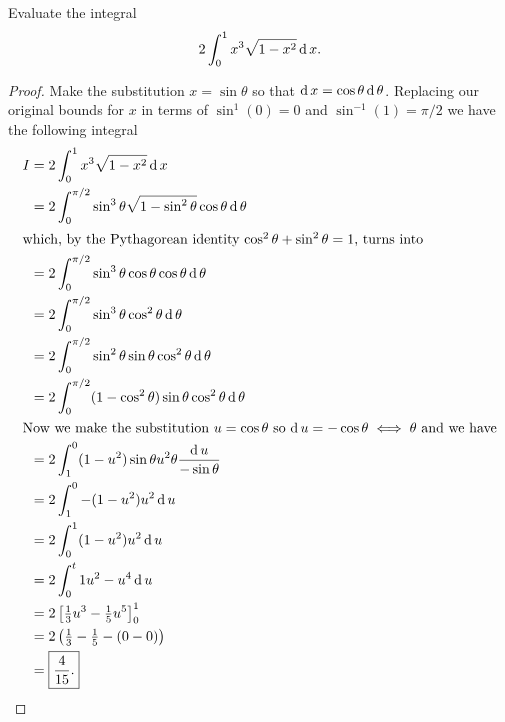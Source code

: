 \begin{problem}[WebAssign, HW 11, \#2]
Evaluate the integral
\[
2\int_0^1 x^3\sqrt{1-x^2}\operatorname{d} x.
\]
\end{problem}
\begin{proof}
Make the substitution $x=\sin\theta$ so that $\operatorname{d}
x=\cos\theta\operatorname{d}\theta$. Replacing our original bounds for $x$ in terms of
$\sin^1(0)=0$ and $\sin^{-1}(1)=\pi/2$ we have the following integral
\begin{align*}
I&=2\int_0^1 x^3\sqrt{1-x^2}\operatorname{d} x\\
 &=2\int_0^{\pi/2}\sin^3\theta\sqrt{1-\sin^2\theta}\cos\theta\operatorname{d}\theta\\
\intertext{which, by the Pythagorean identity
  $\cos^2\theta+\sin^2\theta=1$, turns into}
 &=2\int_0^{\pi/2}\sin^3\theta\cos\theta\cos\theta\operatorname{d}\theta\\
 &=2\int_0^{\pi/2}\sin^3\theta\cos^2\theta\operatorname{d}\theta\\
 &=2\int_0^{\pi/2}\sin^2\theta\sin\theta\cos^2\theta\operatorname{d}\theta\\
 &=2\int_0^{\pi/2}(1-\cos^2\theta)\sin\theta\cos^2\theta\operatorname{d}\theta\\
\intertext{Now we make the substitution $u=\cos\theta$ so $\operatorname{d}
  u=-\cos\theta\iff\theta$ and we have}
 &=2\int_1^0(1-u^2)\sin\theta u^2\theta\frac{\operatorname{d} u}{-\sin\theta}\\
 &=2\int_1^0-(1-u^2)u^2\operatorname{d} u\\
 &=2\int_0^1(1-u^2)u^2\operatorname{d} u\\
 &=2\int_0^t1 u^2-u^4\operatorname{d} u\\
 &=2\left[\tfrac{1}{3}u^3-\tfrac{1}{5}u^5\right]_0^1\\
 &=2\left(\tfrac{1}{3}-\tfrac{1}{5}-(0-0)\right)\\
 &=\boxed{\frac{4}{15}.}\qedhere
\end{align*}
\end{proof}

